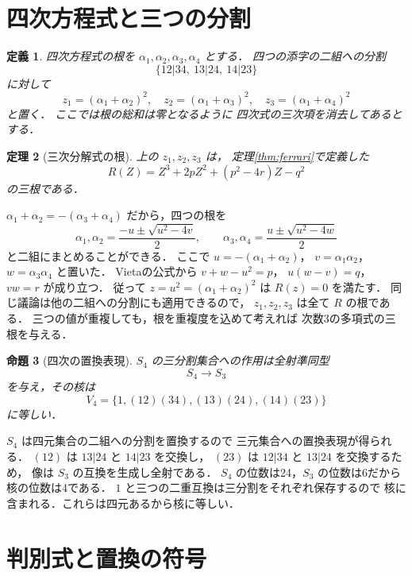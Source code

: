 \documentclass[a5paper,10pt,onecolumn]{jsarticle}
\makeatletter
\theoremstyle{mathnotetheorem}
\newtheorem{theorem}{定理}[section]
\newtheorem{definition}[theorem]{定義}
\newtheorem{proposition}[theorem]{命題}
\renewcommand{\proofname}{証明}
\renewenvironment{proof}[1][\proofname]{%
  \par\pushQED{\qed}\normalfont\topsep4\p@\@plus2\p@\relax
  \trivlist\item[\hskip\labelsep\bfseries #1]\ignorespaces
}{\popQED\endtrivlist\@endpefalse}
\makeatother
\begin{document}
\section{四次方程式と三つの分割}

\begin{definition}
四次方程式の根を
$\alpha_1,\alpha_2,\alpha_3,\alpha_4$ とする．
四つの添字の二組への分割
\[
 \{12|34,\ 13|24,\ 14|23\}
\]
に対して
\[
 z_1=(\alpha_1+\alpha_2)^2,\quad
 z_2=(\alpha_1+\alpha_3)^2,\quad
 z_3=(\alpha_1+\alpha_4)^2
\]
と置く．
ここでは根の総和は零となるように
四次式の三次項を消去してあるとする．
\end{definition}

\begin{theorem}[三次分解式の根]\label{thm:resolvent}
上の $z_1,z_2,z_3$ は，
定理\ref{thm:ferrari}で定義した
\[
 R(Z)=Z^3+2pZ^2+(p^2-4r)Z-q^2
\]
の三根である．
\end{theorem}
\begin{proof}
$\alpha_1+\alpha_2=-(\alpha_3+\alpha_4)$
だから，四つの根を
\[
 \alpha_1,\alpha_2
 =\frac{-u\pm\sqrt{u^2-4v}}2,\qquad
 \alpha_3,\alpha_4
 =\frac{u\pm\sqrt{u^2-4w}}2
\]
と二組にまとめることができる．
ここで $u=-(\alpha_1+\alpha_2)$，
$v=\alpha_1\alpha_2$，
$w=\alpha_3\alpha_4$ と置いた．
Vietaの公式から
$v+w-u^2=p$，
$u(w-v)=q$，
$vw=r$ が成り立つ．
従って $z=u^2=(\alpha_1+\alpha_2)^2$
は $R(z)=0$ を満たす．
同じ議論は他の二組への分割にも適用できるので，
$z_1,z_2,z_3$ は全て $R$ の根である．
三つの値が重複しても，根を重複度を込めて考えれば
次数3の多項式の三根を与える．
\end{proof}

\begin{proposition}[四次の置換表現]\label{prop:s4-s3}
$S_4$ の三分割集合への作用は全射準同型
\[
 S_4\longrightarrow S_3
\]
を与え，その核は
\[
 V_4=\{1,(12)(34),(13)(24),(14)(23)\}
\]
に等しい．
\end{proposition}
\begin{proof}
$S_4$ は四元集合の二組への分割を置換するので
三元集合への置換表現が得られる．
$(12)$ は $13|24$ と $14|23$ を交換し，
$(23)$ は $12|34$ と $13|24$ を交換するため，
像は $S_3$ の互換を生成し全射である．
$S_4$ の位数は24，$S_3$ の位数は6だから
核の位数は4である．
$1$ と三つの二重互換は三分割をそれぞれ保存するので
核に含まれる．これらは四元あるから核に等しい．
\end{proof}

\section{判別式と置換の符号}
\end{document}
